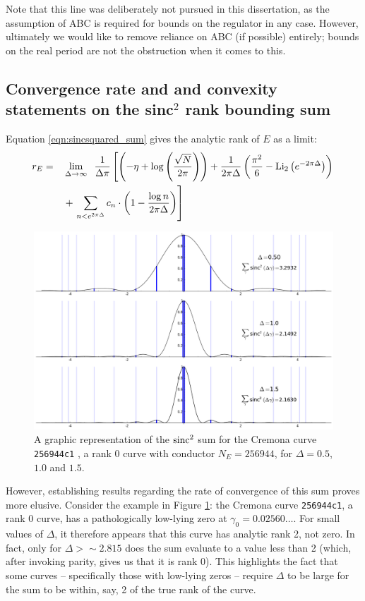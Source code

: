 Note that this line was deliberately not pursued in this dissertation, as the assumption of ABC is required for bounds on the regulator in any case. However, ultimately we would like to remove reliance on ABC (if possible) entirely; bounds on the real period are not the obstruction when it comes to this.

\subsection{Convergence rate and and convexity statements on the sinc$^2$ rank bounding sum}

Equation \ref{eqn:sincsquared_sum} gives the analytic rank of $E$ as a limit:
\begin{align}
r_E = \quad & \lim_{\Delta \to \infty} \;\; \frac{1}{\Delta \pi}\left[\left(-\eta + \log\left(\frac{\sqrt{N}}{2\pi}\right)\right)+ \frac{1}{2\pi \Delta}\left(\frac{\pi^2}{6} - \text{Li}_2\left(e^{-2\pi \Delta}\right)\right)  \right. \nonumber \\
&+ \left.\sum_{n<e^{2\pi \Delta}} c_n \cdot \left(1-\frac{\log n}{2\pi \Delta}\right)\right]
\end{align}

\begin{figure}[!h]
    \centering
    \includegraphics[width=1.0\textwidth]{graphics/256944c1_zero_sum.png}
    \caption{A graphic representation of the $\text{sinc}^2$ sum for the Cremona curve {\tt 256944c1} , a rank 0 curve with conductor $N_E=256944$, for $\Delta = 0.5$, $1.0$ and $1.5$.}
    \label{fig:256944c1_zero_sum}
\end{figure}

However, establishing results regarding the rate of convergence of this sum proves more elusive. Consider the example in Figure \ref{fig:256944c1_zero_sum}: the Cremona curve {\tt 256944c1}, a rank 0 curve, has a pathologically low-lying zero at $\gamma_0 = 0.02560\ldots$. For small values of $\Delta$, it therefore appears that this curve has analytic rank 2, not zero. In fact, only for $\Delta>\sim 2.815$ does the sum evaluate to a value less than 2 (which, after invoking parity, gives us that it is rank 0). This highlights the fact that some curves -- specifically those with low-lying zeros -- require $\Delta$ to be large for the sum to be within, say, 2 of the true rank of the curve. \\

